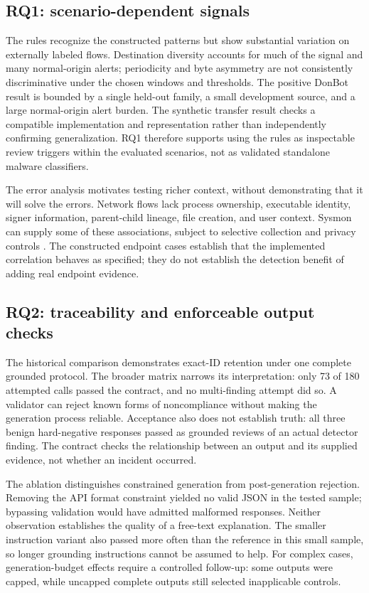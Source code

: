 \documentclass[11pt,a4paper,onecolumn]{IEEEtran}
\begin{document}
\subsection{RQ1: scenario-dependent signals}

The rules recognize the constructed patterns but show substantial variation on externally labeled flows. Destination diversity accounts for much of the signal and many normal-origin alerts; periodicity and byte asymmetry are not consistently discriminative under the chosen windows and thresholds. The positive DonBot result is bounded by a single held-out family, a small development source, and a large normal-origin alert burden. The synthetic transfer result checks a compatible implementation and representation rather than independently confirming generalization. RQ1 therefore supports using the rules as inspectable review triggers within the evaluated scenarios, not as validated standalone malware classifiers.

The error analysis motivates testing richer context, without demonstrating that it will solve the errors. Network flows lack process ownership, executable identity, signer information, parent-child lineage, file creation, and user context. Sysmon can supply some of these associations, subject to selective collection and privacy controls \cite{sysmonevents2026}. The constructed endpoint cases establish that the implemented correlation behaves as specified; they do not establish the detection benefit of adding real endpoint evidence.

\subsection{RQ2: traceability and enforceable output checks}

The historical comparison demonstrates exact-ID retention under one complete grounded protocol. The broader matrix narrows its interpretation: only 73 of 180 attempted calls passed the contract, and no multi-finding attempt did so. A validator can reject known forms of noncompliance without making the generation process reliable. Acceptance also does not establish truth: all three benign hard-negative responses passed as grounded reviews of an actual detector finding. The contract checks the relationship between an output and its supplied evidence, not whether an incident occurred.

The ablation distinguishes constrained generation from post-generation rejection. Removing the API format constraint yielded no valid JSON in the tested sample; bypassing validation would have admitted malformed responses. Neither observation establishes the quality of a free-text explanation. The smaller instruction variant also passed more often than the reference in this small sample, so longer grounding instructions cannot be assumed to help. For complex cases, generation-budget effects require a controlled follow-up: some outputs were capped, while uncapped complete outputs still selected inapplicable controls.
\end{document}
